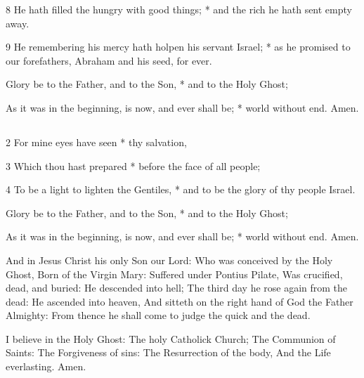 8 He hath filled the hungry with good things; * and the rich he hath sent empty away.

9 He remembering his mercy hath holpen his servant Israel; * as he promised to our forefathers, Abraham and his seed, for ever.

Glory be to the Father, and to the Son, * and to the Holy Ghost;

As it was in the beginning, is now, and ever shall be; * world without end. Amen.

\medskip

\subsection{}


2 For mine eyes have seen * thy salvation,

3 Which thou hast prepared * before the face of all people;

4 To be a light to lighten the Gentiles, * and to be the glory of thy people Israel.

Glory be to the Father, and to the Son, * and to the Holy Ghost;

As it was in the beginning, is now, and ever shall be; * world without end. Amen.

\medskip


And in Jesus Christ his only Son our Lord: Who was conceived by the Holy Ghost, Born of the Virgin Mary: Suffered under Pontius Pilate, Was crucified, dead, and buried: He descended into hell; The third day he rose again from the dead: He ascended into heaven, And sitteth on the right hand of God the Father Almighty: From thence he shall come to judge the quick and the dead.

I believe in the Holy Ghost: The holy Catholick Church; The Communion of Saints: The Forgiveness of sins: The Resurrection of the body, And the Life everlasting. Amen.

\medskip

